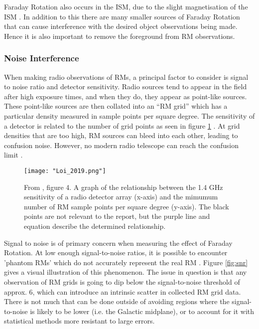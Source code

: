 Faraday Rotation also occurs in the ISM, due to the slight magnetisation of the ISM \citep{ID37, ID30, ID21}. In addition to this there are many smaller sources of Faraday Rotation that can cause interference with the desired object observations being made. Hence it is also important to remove the foreground from RM observations.


\subsubsection{Noise Interference}
\label{sssec:SNR}

When making radio observations of RMs, a principal factor to consider is signal to noise ratio and detector sensitivity. Radio sources tend to appear in the field after high exposure times, and when they do, they appear as point-like sources. These point-like sources are then collated into an “RM grid” which has a particular density measured in sample points per square degree. The sensitivity of a detector is related to the number of grid points as seen in figure \ref{fig:loi} \citep{ID59}. At grid densities that are too high, RM sources can bleed into each other, leading to confusion noise. However, no modern radio telescope can reach the confusion limit \citep{ID59}.

\begin{figure}
    \texttt{[image: "Loi\_2019.png"]}
    \centering
    \caption{From \citep{ID59}, figure 4. A graph of the relationship between the 1.4 GHz sensitivity of a radio detector array (x-axis) and the mimumum number of RM sample points per square degree (y-axis). The black points are not relevant to the report, but the purple line and equation describe the determined relationship.}
    \label{fig:loi}
\end{figure}

Signal to noise is of primary concern when measuring the effect of Faraday Rotation. At low enough signal-to-noise ratios, it is possible to encounter 'phantom RMs' which do not accurately represent the real RM \citep{ID60}. Figure \ref{fig:snr} gives a visual illustration of this phenomenon. The issue in question is that any observation of RM grids is going to dip below the signal-to-noise threshold of approx. 6, which can introduce an intrinsic scatter in collected RM grid data. There is not much that can be done outside of avoiding regions where the signal-to-noise is likely to be lower (i.e. the Galactic midplane), or to account for it with statistical methods more resistant to large errors.

